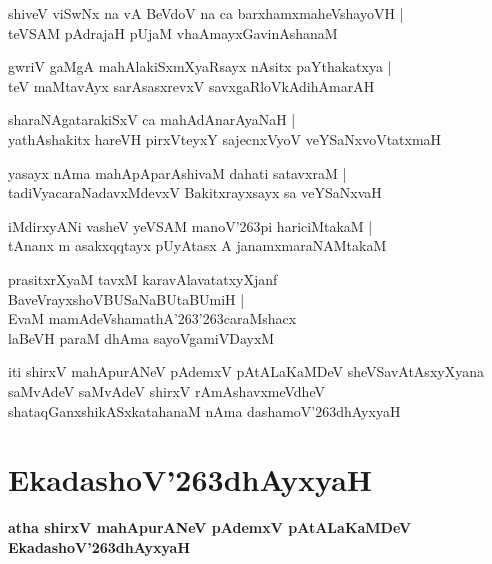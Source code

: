 \documentclass[twoside,12pt,openright]{book}
\def\S{\char'263}
\newcounter{shloka}[chapter]
\begin{document}
\begin{shloka}%
shiveV viSwNx na vA BeVdoV na ca barxhamxmaheVshayoVH |\\
teVSAM pAdrajaH pUjaM vhaAmayxGavinAshanaM 
\end{shloka}

\begin{shloka}%
gwriV gaMgA mahAlakiSxmXyaRsayx nAsitx paYthakatxya |\\
teV maMtavAyx sarAsasxrevxV savxgaRloVkAdihAmarAH 
\end{shloka}

\begin{shloka}%
sharaNAgatarakiSxV ca mahAdAnarAyaNaH |\\
yathAshakitx hareVH pirxVteyxY sajecnxVyoV veYSaNxvoVtatxmaH 
\end{shloka}

\begin{shloka}%
yasayx nAma mahApAparAshivaM dahati satavxraM |\\
tadiVyacaraNadavxMdevxV Bakitxrayxsayx sa veYSaNxvaH
\end{shloka}

\begin{shloka}%
iMdirxyANi vasheV yeVSAM manoV\S pi hariciMtakaM |\\
tAnanx m asakxqqtayx pUyAtasx A janamxmaraNAMtakaM 
\end{shloka}

\begin{shloka}%
prasitxrXyaM tavxM karavAlavatatxyXjanf \\
BaveVrayxshoVBUSaNaBUtaBUmiH |\\
EvaM mamAdeVshamathA\S\S caraMshacx\\
laBeVH paraM dhAma sayoVgamiVDayxM 
\end{shloka}

\begin{center}
iti shirxV mahApurANeV pAdemxV pAtALaKaMDeV sheVSavAtAsxyXyana saMvAdeV 
saMvAdeV shirxV rAmAshavxmeVdheV shataqGanxshikASxkatahanaM nAma dashamoV\S dhAyxyaH
\end{center}

\chapter{EkadashoV\S dhAyxyaH}

\begin{center}
{\LARGE\bfseries atha shirxV mahApurANeV pAdemxV pAtALaKaMDeV EkadashoV\S dhAyxyaH}
\end{center}
\end{document}
